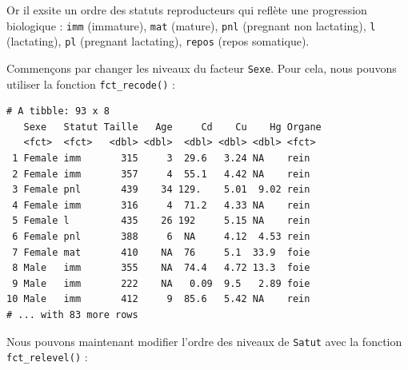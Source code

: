 \documentclass[a4paperpaper,]{article}
\newenvironment{Shaded}{\begin{snugshade}}{\end{snugshade}}
\newcommand{\DataTypeTok}[1]{\textcolor[rgb]{0.00,0.34,0.68}{#1}}
\newcommand{\KeywordTok}[1]{\textcolor[rgb]{0.12,0.11,0.11}{\textbf{#1}}}
\newcommand{\NormalTok}[1]{\textcolor[rgb]{0.12,0.11,0.11}{#1}}
\newcommand{\OperatorTok}[1]{\textcolor[rgb]{0.12,0.11,0.11}{#1}}
\newcommand{\StringTok}[1]{\textcolor[rgb]{0.75,0.01,0.01}{#1}}
\begin{document}
Or il exsite un ordre des statuts reproducteurs qui reflète une progression biologique :
\texttt{imm} (immature), \texttt{mat} (mature), \texttt{pnl} (pregnant non lactating), \texttt{l} (lactating), \texttt{pl} (pregnant lactating), \texttt{repos} (repos somatique).

Commençons par changer les niveaux du facteur \texttt{Sexe}. Pour cela, nous pouvons utiliser la fonction \texttt{fct\_recode()} :

\begin{Shaded}
\end{Shaded}

\begin{verbatim}
# A tibble: 93 x 8
   Sexe   Statut Taille   Age     Cd    Cu    Hg Organe
   <fct>  <fct>   <dbl> <dbl>  <dbl> <dbl> <dbl> <fct> 
 1 Female imm       315     3  29.6   3.24 NA    rein  
 2 Female imm       357     4  55.1   4.42 NA    rein  
 3 Female pnl       439    34 129.    5.01  9.02 rein  
 4 Female imm       316     4  71.2   4.33 NA    rein  
 5 Female l         435    26 192     5.15 NA    rein  
 6 Female pnl       388     6  NA     4.12  4.53 rein  
 7 Female mat       410    NA  76     5.1  33.9  foie  
 8 Male   imm       355    NA  74.4   4.72 13.3  foie  
 9 Male   imm       222    NA   0.09  9.5   2.89 foie  
10 Male   imm       412     9  85.6   5.42 NA    rein  
# ... with 83 more rows
\end{verbatim}

Nous pouvons maintenant modifier l'ordre des niveaux de \texttt{Satut} avec la fonction \texttt{fct\_relevel()} :

\begin{Shaded}
\end{Shaded}
\end{document}
